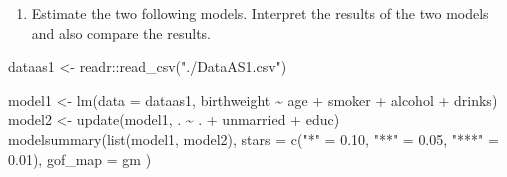 \documentclass[
]{article}
\newenvironment{Shaded}{\begin{snugshade}}{\end{snugshade}}
\newcommand{\AttributeTok}[1]{\textcolor[rgb]{0.77,0.63,0.00}{#1}}
\newcommand{\FloatTok}[1]{\textcolor[rgb]{0.00,0.00,0.81}{#1}}
\newcommand{\FunctionTok}[1]{\textcolor[rgb]{0.00,0.00,0.00}{#1}}
\newcommand{\NormalTok}[1]{#1}
\newcommand{\OtherTok}[1]{\textcolor[rgb]{0.56,0.35,0.01}{#1}}
\newcommand{\SpecialCharTok}[1]{\textcolor[rgb]{0.00,0.00,0.00}{#1}}
\newcommand{\StringTok}[1]{\textcolor[rgb]{0.31,0.60,0.02}{#1}}
\providecommand{\tightlist}{%
  \setlength{\itemsep}{0pt}\setlength{\parskip}{0pt}}
\begin{document}
\begin{enumerate}
\def\labelenumi{\alph{enumi}.}
\tightlist
\item
  Estimate the two following models. Interpret the results of the two
  models and also compare the results.
\end{enumerate}

\small

\begin{Shaded}
\begin{Highlighting}[]
\NormalTok{dataas1 }\OtherTok{\textless{}{-}}\NormalTok{ readr}\SpecialCharTok{::}\FunctionTok{read\_csv}\NormalTok{(}\StringTok{"./DataAS1.csv"}\NormalTok{)}
\end{Highlighting}
\end{Shaded}

\normalsize

\small

\begin{Shaded}
\begin{Highlighting}[]
\NormalTok{model1 }\OtherTok{\textless{}{-}} \FunctionTok{lm}\NormalTok{(}\AttributeTok{data =}\NormalTok{ dataas1, birthweight }\SpecialCharTok{\textasciitilde{}}\NormalTok{ age }\SpecialCharTok{+}\NormalTok{ smoker }\SpecialCharTok{+}\NormalTok{ alcohol }\SpecialCharTok{+}\NormalTok{ drinks)}
\NormalTok{model2 }\OtherTok{\textless{}{-}} \FunctionTok{update}\NormalTok{(model1, . }\SpecialCharTok{\textasciitilde{}}\NormalTok{ . }\SpecialCharTok{+}\NormalTok{ unmarried }\SpecialCharTok{+}\NormalTok{ educ)}
\FunctionTok{modelsummary}\NormalTok{(}\FunctionTok{list}\NormalTok{(model1, model2), }
             \AttributeTok{stars =} \FunctionTok{c}\NormalTok{(}\StringTok{"*"} \OtherTok{=} \FloatTok{0.10}\NormalTok{, }\StringTok{"**"} \OtherTok{=} \FloatTok{0.05}\NormalTok{, }\StringTok{"***"} \OtherTok{=} \FloatTok{0.01}\NormalTok{),}
             \AttributeTok{gof\_map =}\NormalTok{ gm}
\NormalTok{             ) }
\end{Highlighting}
\end{Shaded}
\end{document}
